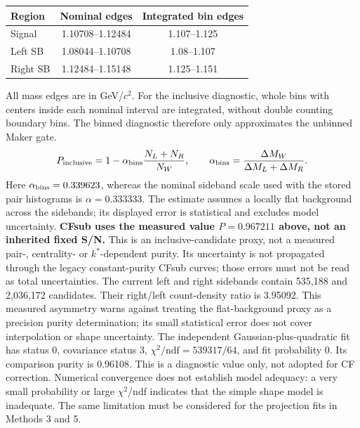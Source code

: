 \documentclass[11pt,a4paper]{article}
\begin{document}
\begin{center}\begin{tabular}{lcc}\hline Region & Nominal edges & Integrated bin edges\\\hline
Signal & 1.10708--1.12484 & 1.107--1.125\\
Left SB & 1.08044--1.10708 & 1.08--1.107\\
Right SB & 1.12484--1.15148 & 1.125--1.151\\
\hline\end{tabular}\end{center}
All mass edges are in GeV/$c^2$. For the inclusive diagnostic, whole bins with centers inside each nominal interval are integrated, without double counting boundary bins. The binned diagnostic therefore only approximates the unbinned Maker gate.
\begin{equation}P_{\rm inclusive}=1-\alpha_{\rm bins}\frac{N_L+N_R}{N_W},\qquad \alpha_{\rm bins}=\frac{\Delta M_W}{\Delta M_L+\Delta M_R}.\end{equation}
Here $\alpha_{\rm bins}=0.339623$, whereas the nominal sideband scale used with the stored pair histograms is $\alpha=0.333333$. The estimate assumes a locally flat background across the sidebands; its displayed error is statistical and excludes model uncertainty.
\textbf{CFsub uses the measured value $P=0.967211$ above, not an inherited fixed S/N.} This is an inclusive-candidate proxy, not a measured pair-, centrality- or $k^*$-dependent purity. Its uncertainty is not propagated through the legacy constant-purity CFsub curves; those errors must not be read as total uncertainties.
The current left and right sidebands contain 535,188 and 2,036,172 candidates. Their right/left count-density ratio is 3.95092. This measured asymmetry warns against treating the flat-background proxy as a precision purity determination; its small statistical error does not cover interpolation or shape uncertainty.
The independent Gaussian-plus-quadratic fit has status 0, covariance status 3, $\chi^2/\mathrm{ndf}=539317/64$, and fit probability 0. Its comparison purity is 0.96108. This is a diagnostic value only, not adopted for CF correction. Numerical convergence does not establish model adequacy: a very small probability or large $\chi^2$/ndf indicates that the simple shape model is inadequate. The same limitation must be considered for the projection fits in Methods 3 and 5.
\end{document}
